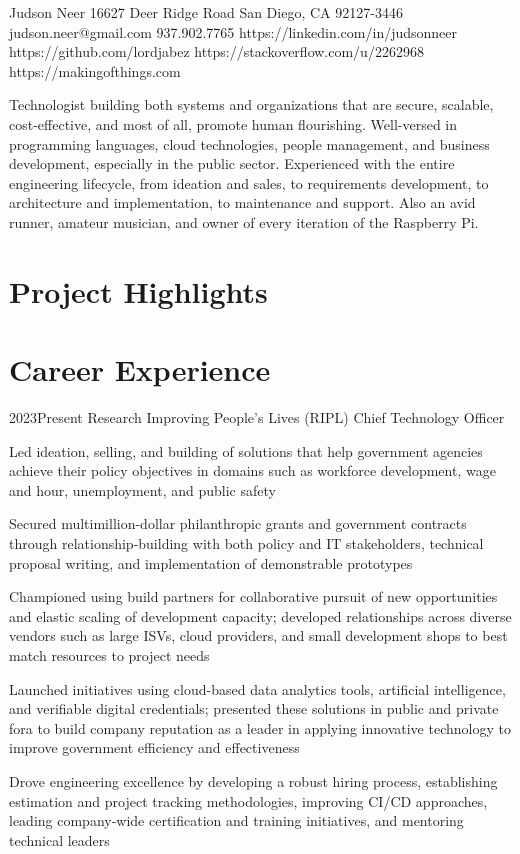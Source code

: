 \documentclass{article}
\begin{document}
\header
  {Judson Neer}
  {16627 Deer Ridge Road}
  {San Diego, CA 92127-3446}
  {judson.neer@gmail.com}
  {937.902.7765}
  {https://linkedin.com/in/judsonneer}
  {https://github.com/lordjabez}
  {https://stackoverflow.com/u/2262968}
  {https://makingofthings.com}


\vspace{4mm}

Technologist building both systems and organizations that are secure, scalable, cost-effective, and most of all, promote human flourishing. Well-versed in programming languages, cloud technologies, people management, and business development, especially in the public sector. Experienced with the entire engineering lifecycle, from ideation and sales, to requirements development, to architecture and implementation, to maintenance and support. Also an avid runner, amateur musician, and owner of every iteration of the Raspberry Pi.


\section{Project Highlights}




\pagebreak


\section{Career Experience}

\job
  {2023}{Present}
  {Research Improving People's Lives (RIPL)}
  {Chief Technology Officer}
  {\begin{achievements}
    \item Led ideation, selling, and building of solutions that help government agencies achieve their policy objectives in domains such as workforce development, wage and hour, unemployment, and public safety
    \item Secured multimillion-dollar philanthropic grants and government contracts through relationship-building with both policy and IT stakeholders, technical proposal writing, and implementation of demonstrable prototypes
    \item Championed using build partners for collaborative pursuit of new opportunities and elastic scaling of development capacity; developed relationships across diverse vendors such as large ISVs, cloud providers, and small development shops to best match resources to project needs
    \item Launched initiatives using cloud-based data analytics tools, artificial intelligence, and verifiable digital credentials; presented these solutions in public and private fora to build company reputation as a leader in applying innovative technology to improve government efficiency and effectiveness
    \item Drove engineering excellence by developing a robust hiring process, establishing estimation and project tracking methodologies, improving CI/CD approaches, leading company-wide certification and training initiatives, and mentoring technical leaders
  \end{achievements}}
\end{document}
